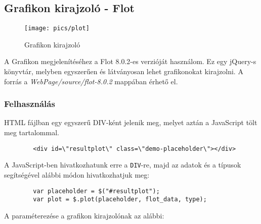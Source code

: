 \subsection{Grafikon kirajzoló - Flot \label{subsec:flot}}

	\begin{figure}[h]
	\texttt{[image: pics/plot]}
	\centering
	\caption{Grafikon kirajzoló\label{fig:plot}}
	\end{figure}
	
	A Grafikon megjelenítéséhez a Flot 8.0.2-es verzióját használom. Ez egy jQuery-s könyvtár, melyben egyszerűen és látványosan lehet grafikonokat kirajzolni. A forrás a \textit{WebPage/source/flot-8.0.2} mappában érhető el.
	\subsubsection{Felhasználás}
	HTML fájlban egy egyszerű DIV-ként jelenik meg, melyet aztán a JavaScript tölt meg tartalommal.
	\begin{verbatim}
		<div id=\"resultplot\" class=\"demo-placeholder\"></div>
	\end{verbatim}
	A JavaScript-ben hivatkozhatunk erre a \texttt{DIV}-re, majd az adatok és a típusok segítségével alábbi módon hivatkozhatjuk meg: 
	\begin{verbatim}
		var placeholder = $("#resultplot");
		var plot = $.plot(placeholder, flot_data, type);
	\end{verbatim}
	A paraméterezése a grafikon kirajzolónak az alábbi: 
